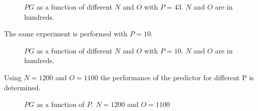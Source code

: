 \begin{figure}[H]
	\centering
	
	\caption{$PG$ as a function of different $N$ and $O$ with $P=43$. $N$ and $O$ are in hundreds.}
	\label{fig:Predict43App}
\end{figure}

The same experiment is performed with $P=10$.
\begin{figure}[H]
	\centering
	
	\caption{$PG$ as a function of different $N$ and $O$ with $P=10$. $N$ and $O$ are in hundreds.}
	\label{fig:Predict10App}
\end{figure}

Using $N=1200$ and $O=1100$ the performance of the predictor for different P is determined. 
\begin{figure}[H]
	\centering
	
	\caption{$PG$ as a function of $P$. $N=1200$ and $O=1100$}
	\label{fig:PredictPApp}
\end{figure}

